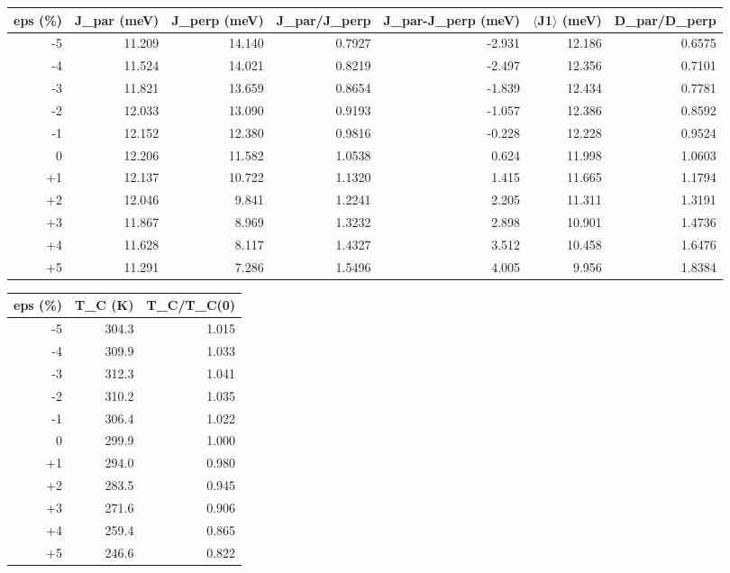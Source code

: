 \begin{tabular}{rrrrrrr}
\hline
eps (\%) & J\_par (meV) & J\_perp (meV) & J\_par/J\_perp & J\_par-J\_perp (meV) & $\langle$J1$\rangle$ (meV) & D\_par/D\_perp \\
\hline
-5 & 11.209 & 14.140 & 0.7927 & -2.931 & 12.186 & 0.6575 \\
-4 & 11.524 & 14.021 & 0.8219 & -2.497 & 12.356 & 0.7101 \\
-3 & 11.821 & 13.659 & 0.8654 & -1.839 & 12.434 & 0.7781 \\
-2 & 12.033 & 13.090 & 0.9193 & -1.057 & 12.386 & 0.8592 \\
-1 & 12.152 & 12.380 & 0.9816 & -0.228 & 12.228 & 0.9524 \\
0 & 12.206 & 11.582 & 1.0538 & 0.624 & 11.998 & 1.0603 \\
+1 & 12.137 & 10.722 & 1.1320 & 1.415 & 11.665 & 1.1794 \\
+2 & 12.046 & 9.841 & 1.2241 & 2.205 & 11.311 & 1.3191 \\
+3 & 11.867 & 8.969 & 1.3232 & 2.898 & 10.901 & 1.4736 \\
+4 & 11.628 & 8.117 & 1.4327 & 3.512 & 10.458 & 1.6476 \\
+5 & 11.291 & 7.286 & 1.5496 & 4.005 & 9.956 & 1.8384 \\
\hline
\end{tabular}

\begin{tabular}{rrr}
\hline
eps (\%) & T\_C (K) & T\_C/T\_C(0) \\
\hline
-5 & 304.3 & 1.015 \\
-4 & 309.9 & 1.033 \\
-3 & 312.3 & 1.041 \\
-2 & 310.2 & 1.035 \\
-1 & 306.4 & 1.022 \\
0 & 299.9 & 1.000 \\
+1 & 294.0 & 0.980 \\
+2 & 283.5 & 0.945 \\
+3 & 271.6 & 0.906 \\
+4 & 259.4 & 0.865 \\
+5 & 246.6 & 0.822 \\
\hline
\end{tabular}


